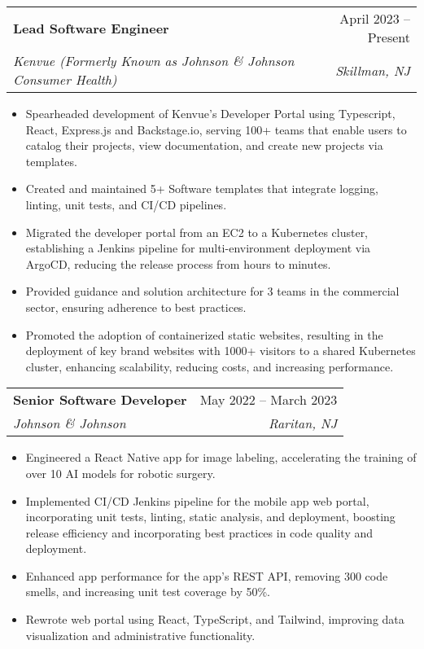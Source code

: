 \documentclass[letterpaper,11pt]{article}
\makeatletter
\newcommand{\resumeItem}[1]{
  \item\small{
    {#1 \vspace{-2pt}}
  }
}
\newcommand{\resumeSubheading}[4]{
  \vspace{-1pt}\item
    \begin{tabular*}{0.99\textwidth}[t]{l@{\extracolsep{\fill}}r}
      \textbf{#1} & #2 \\
      \textit{\small#3} & \textit{\small #4} \\
    \end{tabular*}\vspace{-7pt}
}
\newcommand{\resumeItemListStart}{\begin{itemize}}
\newcommand{\resumeItemListEnd}{\end{itemize}\vspace{-10pt}}
\makeatother
\begin{document}
    \resumeSubheading
      {Lead Software Engineer}{April 2023 -- Present}
      {Kenvue (Formerly Known as Johnson \& Johnson Consumer Health)}{Skillman, NJ}
      \resumeItemListStart[leftmargin=0.15in]
        \resumeItem{Spearheaded development of Kenvue's Developer Portal using Typescript, React, Express.js and Backstage.io, serving 100+ teams that enable users to catalog their projects, view documentation, and create new projects via templates. }
        \resumeItem{Created and maintained 5+ Software templates that integrate logging, linting, unit tests, and CI/CD pipelines.}
        \resumeItem{Migrated the developer portal from an EC2 to a Kubernetes cluster, establishing a Jenkins pipeline for multi-environment deployment via ArgoCD, reducing the release process from hours to minutes.}
        \resumeItem{Provided guidance and solution architecture for 3 teams in the commercial sector, ensuring adherence to best practices.}
        \resumeItem{Promoted the adoption of containerized static websites, resulting in the deployment of key brand websites with 1000+ visitors to a shared Kubernetes cluster, enhancing scalability, reducing costs, and increasing performance. }
    \resumeItemListEnd

    \resumeSubheading
      {Senior Software Developer}{May 2022 -- March 2023}
      {Johnson \& Johnson}{Raritan, NJ}
      \resumeItemListStart[leftmargin=0.15in]
        \resumeItem{ Engineered a React Native app for image labeling, accelerating the training of over 10 AI models for robotic surgery.}
        \resumeItem{Implemented CI/CD Jenkins pipeline for the mobile app web portal, incorporating unit tests, linting, static analysis, and deployment, boosting release efficiency and incorporating best practices in code quality and deployment.}
        \resumeItem{ Enhanced app performance for the app's REST API, removing 300 code smells, and increasing unit test coverage by 50\%.}
        \resumeItem{ Rewrote web portal using React, TypeScript, and Tailwind, improving data visualization and administrative functionality.}
      \resumeItemListEnd
\end{document}
